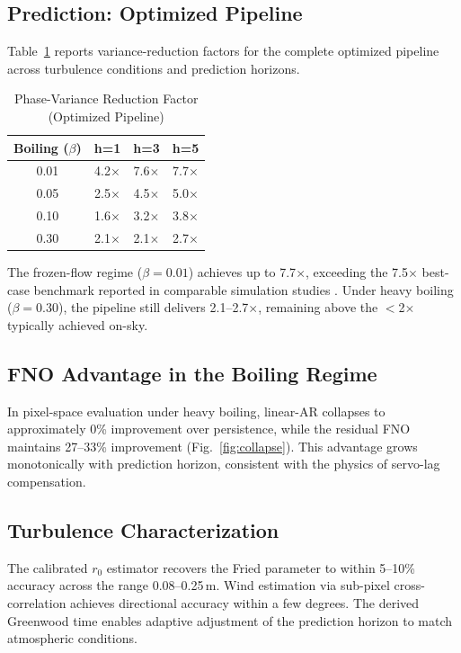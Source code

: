 \documentclass[conference]{IEEEtran}
\begin{document}
\subsection{Prediction: Optimized Pipeline}

Table~\ref{tab:prediction} reports variance-reduction factors for the complete optimized pipeline across turbulence conditions and prediction horizons.

\begin{table}[h]
\centering
\caption{Phase-Variance Reduction Factor (Optimized Pipeline)}
\label{tab:prediction}
\begin{tabular}{cccc}
\toprule
\textbf{Boiling ($\beta$)} & \textbf{h=1} & \textbf{h=3} & \textbf{h=5} \\
\midrule
0.01 & 4.2$\times$ & 7.6$\times$ & 7.7$\times$ \\
0.05 & 2.5$\times$ & 4.5$\times$ & 5.0$\times$ \\
0.10 & 1.6$\times$ & 3.2$\times$ & 3.8$\times$ \\
0.30 & 2.1$\times$ & 2.1$\times$ & 2.7$\times$ \\
\bottomrule
\end{tabular}
\end{table}

The frozen-flow regime ($\beta=0.01$) achieves up to 7.7$\times$, exceeding the 7.5$\times$ best-case benchmark reported in comparable simulation studies \cite{vanKooten2023}. Under heavy boiling ($\beta=0.30$), the pipeline still delivers 2.1--2.7$\times$, remaining above the $<$2$\times$ typically achieved on-sky.

\subsection{FNO Advantage in the Boiling Regime}

In pixel-space evaluation under heavy boiling, linear-AR collapses to approximately 0\% improvement over persistence, while the residual FNO maintains 27--33\% improvement (Fig.~\ref{fig:collapse}). This advantage grows monotonically with prediction horizon, consistent with the physics of servo-lag compensation.

\subsection{Turbulence Characterization}

The calibrated $r_0$ estimator recovers the Fried parameter to within 5--10\% accuracy across the range 0.08--0.25\,m. Wind estimation via sub-pixel cross-correlation achieves directional accuracy within a few degrees. The derived Greenwood time enables adaptive adjustment of the prediction horizon to match atmospheric conditions.
\end{document}
